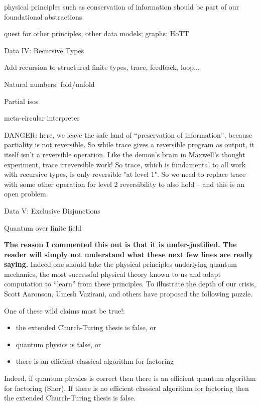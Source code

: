 \documentclass{article}
\newcommand{\jc}[1]{\fbox{Jacques says:} \textbf{#1}}
\begin{document}
physical principles such as conservation of information should be part
of our foundational abstractions

quest for other principles; other data models; graphs; HoTT

Data IV: Recursive Types

Add recursion to structured finite types, trace, feedback, loop...

Natural numbers: fold/unfold

Partial isos

meta-circular interpreter
 
DANGER: here, we leave the safe land of ``preservation of information'',
because partiality is not reversible. So while trace gives a reversible
program as output, it itself isn't a reversible operation. Like the
demon's brain in Maxwell's thought experiment, trace irreversible work!
So trace, which is fundamental to all work with recursive types, is
only reversible "at level 1". So we need to replace trace with some other
operation for level 2 reversibility to also hold -- and this is an open
problem.

Data V: Exclusive Disjunctions

Quantum over finite field 

\jc{The reason I commented this out is that it is under-justified. The  
reader will simply not understand what these next few lines are really
saying.}
Indeed one should take the physical principles underlying quantum mechanics,
the most successful physical theory known to us and adapt computation to
``learn'' from these principles. To illustrate the depth of our crisis, Scott
Aaronson, Umesh Vazirani, and others have proposed the following puzzle.

One of these wild claims must be true!:
\begin{itemize}
\item the extended Church-Turing thesis is false, or
\item quantum physics is false, or
\item there is an efficient classical algorithm for factoring
\end{itemize}
Indeed, if quantum physics is correct then there is an efficient quantum
algorithm for factoring (Shor). If there is no efficient classical algorithm
for factoring then the extended Church-Turing thesis is false.

\end{document}
